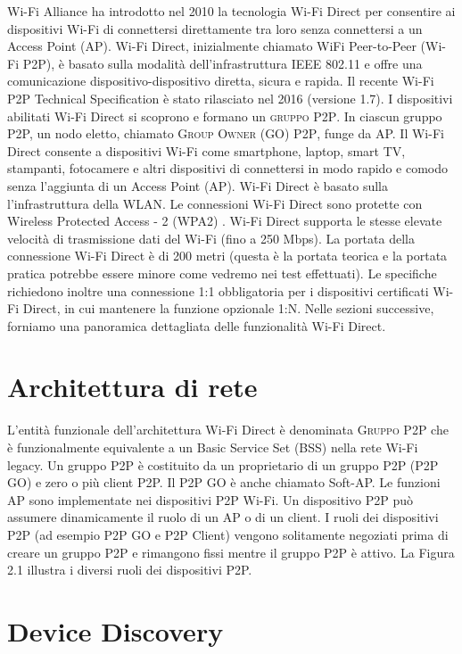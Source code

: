 \label{sec:sezioni}
Wi-Fi Alliance ha introdotto nel 2010 la tecnologia Wi-Fi Direct per consentire
ai dispositivi
Wi-Fi di connettersi direttamente tra loro senza connettersi a un Access Point
(AP). Wi-Fi Direct,
inizialmente chiamato WiFi Peer-to-Peer (Wi-Fi P2P), è basato sulla modalità
dell'infrastruttura
IEEE 802.11 e offre una comunicazione dispositivo-dispositivo diretta, sicura e
rapida. Il recente
Wi-Fi P2P Technical Specification \cite{alliance2016wi} è stato rilasciato nel
2016 (versione 1.7).
I dispositivi abilitati Wi-Fi Direct si scoprono e formano un \textsc{gruppo P2P}. In
ciascun gruppo P2P,
un nodo eletto, chiamato \textsc{Group Owner (GO) P2P}, funge da AP.
Il Wi-Fi Direct consente a dispositivi Wi-Fi come smartphone, laptop, smart TV,
stampanti, fotocamere e altri dispositivi di connettersi in modo rapido e
comodo senza
l'aggiunta di un Access Point (AP). Wi-Fi Direct è basato sulla
l'infrastruttura
della WLAN. Le connessioni Wi-Fi Direct sono protette
con Wireless Protected Access - 2 (WPA2) \cite{mathews2007evolution}.
Wi-Fi Direct supporta le stesse elevate velocità di trasmissione dati del Wi-Fi
(fino a 250 Mbps).
La portata della connessione Wi-Fi Direct è di 200 metri (questa è la portata
teorica e la portata
pratica potrebbe essere minore come vedremo nei test effettuati). Le specifiche richiedono inoltre una
connessione
1:1 obbligatoria per i dispositivi certificati Wi-Fi Direct, in cui mantenere
la funzione opzionale 1:N. Nelle sezioni successive,
forniamo una panoramica dettagliata delle funzionalità Wi-Fi Direct.

\section{Architettura di rete}

L'entità funzionale dell'architettura Wi-Fi Direct è denominata
\textsc{Gruppo P2P} che è funzionalmente equivalente a un Basic Service Set
(BSS) nella rete Wi-Fi legacy. Un gruppo P2P è costituito da un proprietario
di un gruppo P2P (P2P GO) e zero o più client P2P. Il P2P GO
è anche chiamato Soft-AP. Le funzioni AP sono implementate nei dispositivi P2P
Wi-Fi.
Un dispositivo P2P può assumere dinamicamente il ruolo di un AP o di un client.
I ruoli
dei dispositivi P2P (ad esempio P2P GO e P2P Client) vengono solitamente
negoziati prima
di creare un gruppo P2P e rimangono fissi mentre il gruppo P2P è attivo. La
Figura 2.1 illustra
i diversi ruoli dei dispositivi P2P.

\section{Device Discovery}

